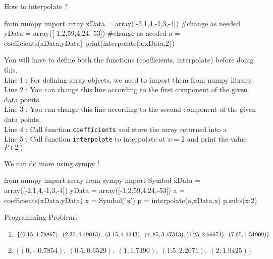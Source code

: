 \begin{program}How to interpolate ?
	\begin{python}
		from numpy import array
		xData = array([-2,1,4,-1,3,-4]) #change as needed
		yData = array([-1,2,59,4,24,-53]) #change as needed
		a = coefficients(xData,yData)
		print(interpolate(a,xData,2))
	\end{python}

	You will have to define both the functions (coefficients, interpolate) before doing this.\\

	Line 1 : For defining array objects, we need to import them from numpy library.\\

	Line 2 : You can change this line according to the first component of the given data points.\\

	Line 3 : You can change this line according to the second component of the given data points.\\

	Line 4 : Call function \texttt{coefficients} and store the array returned into a\\

	Line 5 : Call function \texttt{interpolate} to interpolate at $x = 2$ and print the value $P(2)$
\end{program}

\begin{program}
	We can do more using sympy !
	\begin{python}
		from numpy import array
		from sympy import Symbol
		xData = array([-2,1,4,-1,3,-4])
		yData = array([-1,2,59,4,24,-53])
		a = coefficients(xData,yData)
		x = Symbol('x')
		p = interpolate(a,xData,x)
		p.subs({x:2})
	\end{python}
\end{program}

\begin{remark}
	Programming Problems
	\begin{enumerate}
		\item $\{(0.15,4.79867),\ (2.30,4.49013),\ (3.15,4.2243),\ (4,85,3.47313),\\ (6.25,2.66674),\ (7.95,1.51909)\}$ \cite[Example 3.4]{kiusalaas}
		\item $\{(0,-0.7854),\ (0.5,0.6529),\ (1,1.7390),\ (1.5,2.2071),\ (2,1.9425)\}$\\ \cite[Problem Set 3.1.5]{kiusalaas}
	\end{enumerate}
\end{remark}
